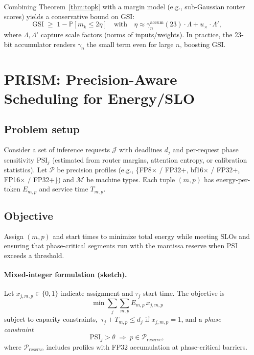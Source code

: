 \documentclass[11pt]{article}
\newcommand{\Prob}{\mathbb{P}}
\theoremstyle{plain}
\theoremstyle{definition}
\begin{document}
Combining Theorem~\ref{thm:topk} with a margin model (e.g., sub-Gaussian router scores) yields a conservative bound on $\mathrm{GSI}$:
\[
\mathrm{GSI} \;\ge\; 1 - \Prob\!\left[m_k \le 2\eta\right]
\quad\text{with}\quad
\eta \approx \gamma_n^{\text{accum}}(23)\cdot \Lambda + u_\times \cdot \Lambda',
\]
where $\Lambda,\Lambda'$ capture scale factors (norms of inputs/weights). In practice, the $23$-bit accumulator renders $\gamma_n$ the small term even for large $n$, boosting $\mathrm{GSI}$.

\section{PRISM: Precision-Aware Scheduling for Energy/SLO}
\label{sec:prism}

\subsection{Problem setup}
Consider a set of inference requests $\mathcal{J}$ with deadlines $d_j$ and per-request phase sensitivity $\mathrm{PSI}_j$ (estimated from router margins, attention entropy, or calibration statistics). Let $\mathcal{P}$ be precision profiles (e.g., \{FP8$\times$ / FP32$+$, bf16$\times$ / FP32$+$, FP16$\times$ / FP32$+$\}) and $\mathcal{M}$ be machine types. Each tuple $(m,p)$ has energy-per-token $E_{m,p}$ and service time $T_{m,p}$.

\subsection{Objective}
Assign $(m,p)$ and start times to minimize total energy while meeting SLOs and ensuring that phase-critical segments run with the mantissa reserve when $\mathrm{PSI}$ exceeds a threshold.

\paragraph{Mixed-integer formulation (sketch).}
Let $x_{j,m,p}\in\{0,1\}$ indicate assignment and $\tau_j$ start time. The objective is
\[
\min \sum_{j}\sum_{m,p} E_{m,p}\, x_{j,m,p}
\]
subject to capacity constraints, $\,\tau_j + T_{m,p}\le d_j$ if $x_{j,m,p}=1$, and a \emph{phase constraint}
\[
\mathrm{PSI}_j > \theta \;\Rightarrow\; p \in \mathcal{P}_{\text{reserve}},
\]
where $\mathcal{P}_{\text{reserve}}$ includes profiles with FP32 accumulation at phase-critical barriers.
\end{document}
